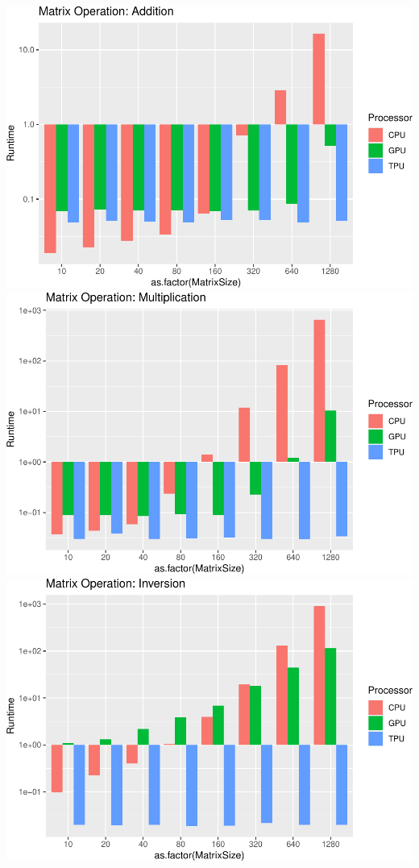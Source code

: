 \documentclass[
]{article}
\begin{document}
\includegraphics{main_files/figure-latex/unnamed-chunk-10-1.pdf}
\includegraphics{main_files/figure-latex/unnamed-chunk-10-2.pdf}
\includegraphics{main_files/figure-latex/unnamed-chunk-10-3.pdf}
\end{document}
